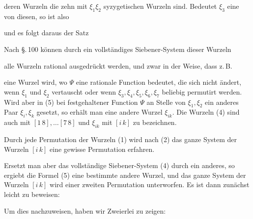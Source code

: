 deren Wurzeln die zehn mit $\xi_1\xi_2$ syzygetischen Wurzeln sind. Bedeutet $\xi_3$ eine von diesen, so ist also


und es folgt daraus der Satz


Nach \S.\,100 können durch ein vollständiges Siebener-System dieser Wurzeln


alle Wurzeln rational ausgedrückt werden, und zwar in der Weise, dass z.\,B.


eine Wurzel wird, wo $\Psi$ eine rationale Function bedeutet, die sich nicht ändert, wenn $\xi_1$ und $\xi_2$ vertauscht oder wenn $\xi_3,\xi_4,\xi_5,\xi_6,\xi_7$ beliebig permutirt werden. Wird aber in (5) bei festgehaltener Function $\Psi$ an Stelle von $\xi_1,\xi_2$ ein anderes Paar $\xi_i,\xi_k$ gesetzt, so erhält man eine andere Wurzel $\xi_{ik}$. Die Wurzeln (4) sind auch mit $[1\,8],\dots[7\,8]$ und $\xi_{ik}$ mit $[i\,k]$ zu bezeichnen.

Durch jede Permutation der Wurzeln (1) wird nach (2) das ganze System der Wurzeln $[i\,k]$ eine gewisse Permutation erfahren.

Ersetzt man aber das vollständige Siebener-System (4) durch ein anderes, so ergiebt die Formel (5) eine bestimmte andere Wurzel, und das ganze System der Wurzeln $[i\,k]$ wird einer zweiten Permutation unterworfen. Es ist dann zunächst leicht zu beweisen:


Um dies nachzuweisen, haben wir Zweierlei zu zeigen:
